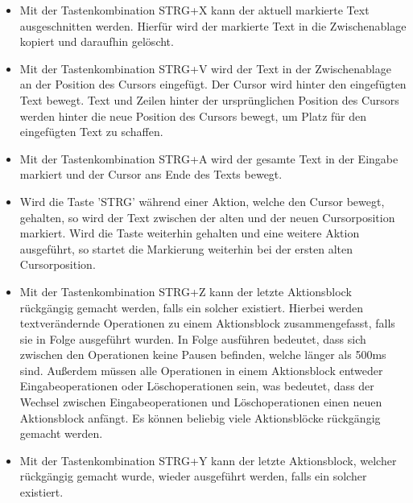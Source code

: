 \documentclass[parskip=full,11pt,twoside]{scrartcl}
\begin{document}
\begin{itemize}
	\item Mit der Tastenkombination STRG+X kann der aktuell markierte Text ausgeschnitten werden. Hierfür wird der markierte Text in die Zwischenablage kopiert und daraufhin gelöscht.
	\item Mit der Tastenkombination STRG+V wird der Text in der Zwischenablage an der Position des Cursors eingefügt. Der Cursor wird hinter den eingefügten Text bewegt. Text und Zeilen hinter der ursprünglichen Position des Cursors werden hinter die neue Position des Cursors bewegt, um Platz für den eingefügten Text zu schaffen.
	\item Mit der Tastenkombination STRG+A wird der gesamte Text in der Eingabe markiert und der Cursor ans Ende des Texts bewegt.
	\item Wird die Taste 'STRG' während einer Aktion, welche den Cursor bewegt, gehalten, so wird der Text zwischen der alten und der neuen Cursorposition markiert. Wird die Taste weiterhin gehalten und eine weitere Aktion ausgeführt, so startet die Markierung weiterhin bei der ersten alten Cursorposition.
	\item Mit der Tastenkombination STRG+Z kann der letzte Aktionsblock rückgängig gemacht werden, falls ein solcher existiert. 
	Hierbei werden textverändernde Operationen zu einem Aktionsblock zusammengefasst, falls sie in Folge ausgeführt wurden. In Folge ausführen bedeutet, dass sich zwischen den Operationen keine Pausen befinden, welche länger als 500ms sind. Außerdem müssen alle Operationen in einem Aktionsblock entweder Eingabeoperationen oder Löschoperationen sein, was bedeutet, dass der Wechsel zwischen Eingabeoperationen und Löschoperationen einen neuen Aktionsblock anfängt.
	Es können beliebig viele Aktionsblöcke rückgängig gemacht werden.
	\item Mit der Tastenkombination STRG+Y kann der letzte Aktionsblock, welcher rückgängig gemacht wurde, wieder ausgeführt werden, falls ein solcher existiert.
\end{itemize}
\end{document}

